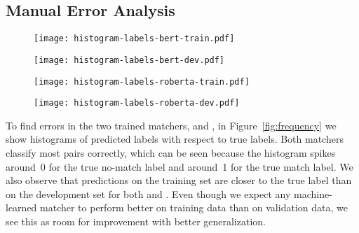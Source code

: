 \subsection{Manual Error Analysis}

\begin{figure*}
    \centering
    \begin{subfigure}{0.485\textwidth}
        \centering
        \texttt{[image: histogram-labels-bert-train.pdf]}
        \label{subfig:bert_train}
    \end{subfigure}
    \hfill
    \begin{subfigure}{0.485\textwidth}
        \centering
        \texttt{[image: histogram-labels-bert-dev.pdf]}
        \label{subfig:bert_dev}
    \end{subfigure}
    \begin{subfigure}{0.485\textwidth}
        \centering
        \texttt{[image: histogram-labels-roberta-train.pdf]}
        \label{subfig:roberta_train}
    \end{subfigure}
    \hfill
    \begin{subfigure}{0.485\textwidth}
        \centering
        \texttt{[image: histogram-labels-roberta-dev.pdf]}
        \label{subfig:roberta_dev}
    \end{subfigure}
    \caption{Histograms of predicted labels on the training and validation sets for argument key point pairs with the \BertBase and \RobertaBase classifiers. For good classifiers, predicted labels should approximately equal the true label~(0~or~1).}
    \label{fig:frequency}
\end{figure*}
To find errors in the two trained matchers, \BertBase and \RobertaBase, in Figure~\ref{fig:frequency} we show histograms of predicted labels with respect to true labels.
Both matchers classify most pairs correctly, which can be seen because the histogram spikes around~0 for the true no-match label and around~1 for the true match label.
We also observe that predictions on the training set are closer to the true label than on the development set for both \RobertaBase and \BertBase.
Even though we expect any machine-learned matcher to perform better on training data than on validation data, we see this as room for improvement with better generalization.
